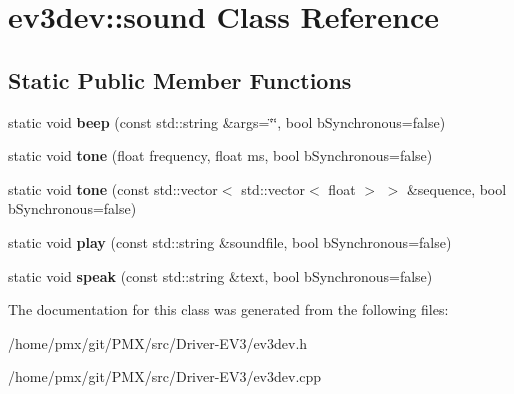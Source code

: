 \hypertarget{classev3dev_1_1sound}{}\section{ev3dev\+:\+:sound Class Reference}
\label{classev3dev_1_1sound}
\subsection*{Static Public Member Functions}
\begin{DoxyCompactItemize}
\item 
\mbox{\label{classev3dev_1_1sound_ac7a61e28e2e12c76148c477a2a22aaa5}} 
static void {\bfseries beep} (const std\+::string \&args=\char`\"{}\char`\"{}, bool b\+Synchronous=false)
\item 
\mbox{\label{classev3dev_1_1sound_ab238634d981b3936fcb263ec5dd7c7e9}} 
static void {\bfseries tone} (float frequency, float ms, bool b\+Synchronous=false)
\item 
\mbox{\label{classev3dev_1_1sound_aab9bb41b34dabc5d3d1914d17c6243cb}} 
static void {\bfseries tone} (const std\+::vector$<$ std\+::vector$<$ float $>$ $>$ \&sequence, bool b\+Synchronous=false)
\item 
\mbox{\label{classev3dev_1_1sound_af190e1cde1f190febbb0b299e8875482}} 
static void {\bfseries play} (const std\+::string \&soundfile, bool b\+Synchronous=false)
\item 
\mbox{\label{classev3dev_1_1sound_a9f81b3ce3698de17bae744dc4269de6c}} 
static void {\bfseries speak} (const std\+::string \&text, bool b\+Synchronous=false)
\end{DoxyCompactItemize}


The documentation for this class was generated from the following files\+:\begin{DoxyCompactItemize}
\item 
/home/pmx/git/\+P\+M\+X/src/\+Driver-\/\+E\+V3/ev3dev.\+h\item 
/home/pmx/git/\+P\+M\+X/src/\+Driver-\/\+E\+V3/ev3dev.\+cpp\end{DoxyCompactItemize}
